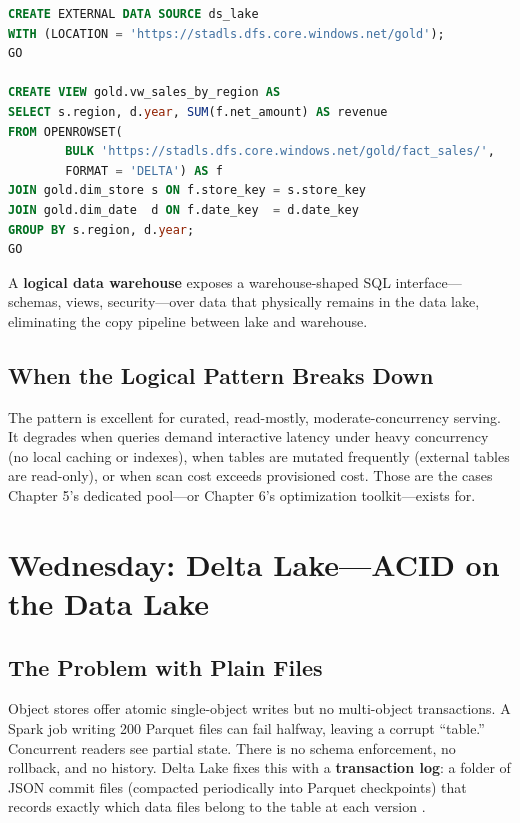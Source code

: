 \begin{lstlisting}[language=SQL,caption={Building a logical warehouse: data source, view, and a gold-zone star query.},label={lst:ch7-logicaldw}]
CREATE EXTERNAL DATA SOURCE ds_lake
WITH (LOCATION = 'https://stadls.dfs.core.windows.net/gold');
GO

CREATE VIEW gold.vw_sales_by_region AS
SELECT s.region, d.year, SUM(f.net_amount) AS revenue
FROM OPENROWSET(
        BULK 'https://stadls.dfs.core.windows.net/gold/fact_sales/',
        FORMAT = 'DELTA') AS f
JOIN gold.dim_store s ON f.store_key = s.store_key
JOIN gold.dim_date  d ON f.date_key  = d.date_key
GROUP BY s.region, d.year;
GO
\end{lstlisting}

\begin{definitionbox}
A \textbf{logical data warehouse} exposes a warehouse-shaped SQL interface---schemas, views, security---over data that physically remains in the data lake, eliminating the copy pipeline between lake and warehouse.
\end{definitionbox}

\subsection{When the Logical Pattern Breaks Down}
The pattern is excellent for curated, read-mostly, moderate-concurrency serving. It degrades when queries demand interactive latency under heavy concurrency (no local caching or indexes), when tables are mutated frequently (external tables are read-only), or when scan cost exceeds provisioned cost. Those are the cases Chapter 5's dedicated pool---or Chapter 6's optimization toolkit---exists for.

\section{Wednesday: Delta Lake---ACID on the Data Lake}

\subsection{The Problem with Plain Files}
Object stores offer atomic single-object writes but no multi-object transactions. A Spark job writing 200 Parquet files can fail halfway, leaving a corrupt ``table.'' Concurrent readers see partial state. There is no schema enforcement, no rollback, and no history. Delta Lake fixes this with a \textbf{transaction log}: a folder of JSON commit files (compacted periodically into Parquet checkpoints) that records exactly which data files belong to the table at each version \cite{armbrust2020delta,deltaio2025delta}.

